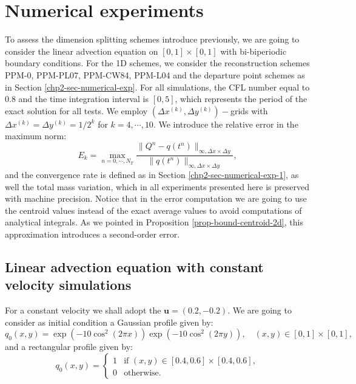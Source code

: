\newpage
\section{Numerical experiments}
\label{sec-ds-exp}
To assess the dimension splitting schemes introduce previously, we are
going to consider the linear advection equation on $[0,1]\times[0,1]$ 
with bi-biperiodic boundary conditions.
For the 1D schemes, we consider the reconstruction schemes PPM-0, PPM-PL07, PPM-CW84,
PPM-L04 and the departure point schemes as in Section \ref{chp2-sec-numerical-exp}.
For all simulations, the CFL number equal to $0.8$ and the time integration interval is $[0,5]$, which represents the period of the exact solution for all tests.
We employ $(\Delta x^{(k)},\Delta y^{(k)})-$grids with 
$\Delta x^{(k)} = \Delta y^{(k)} = 1/2^k$ for $k=4,
\cdots, 10$. We introduce the relative error in the maximum norm:
\begin{equation*}
	E_k = \max_{n=0,\cdots, N_T}
	\frac{\| Q^n - q(t^n) \|_{\infty, \Delta x \times \Delta y}}
	{\|q(t^n)\|_{\infty, \Delta x \times \Delta y}},
\end{equation*}
and the convergence rate is defined as in Section \ref{chp2-sec-numerical-exp-1}, as well
the total mass variation, which in all experiments presented here is preserved with 
machine precision. Notice that in the error computation we are going to use the centroid
values instead of the exact average values to avoid computations of analytical integrals. 
As we pointed in Proposition \ref{prop-bound-centroid-2d}, this approximation introduces a second-order error.
\subsection{Linear advection equation with constant velocity simulations}
For a constant velocity we shall adopt the  $\boldsymbol{u}=(0.2,-0.2)$.
We are going to consider as initial condition a Gaussian profile given by:
\begin{equation}
	\label{chp3-ic1}
	q_0(x,y) = \exp(-10\cos^2 (2\pi x))  \exp(-10\cos^2 (2\pi y)),\quad (x,y) \in [0,1] \times [0,1],
\end{equation}
and a rectangular profile given by:
\begin{equation}
	\label{chp3-ic2}
	q_0(x,y) =  
	\begin{cases}
		1 & \text{if } (x,y) \in [0.4,0.6]\times [0.4,0.6],\\
		0 & \text{otherwise}.
	\end{cases}
\end{equation}

